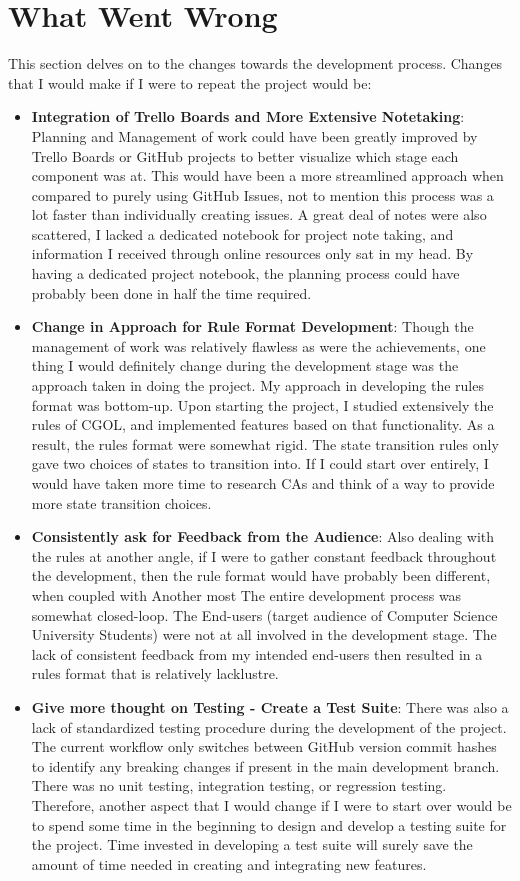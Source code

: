\section{What Went Wrong} \label{whatwentwrong}
This section delves on to the changes towards the development process. Changes that I would make if I were to repeat the project would be:
\begin{itemize}
    \item \textbf{Integration of Trello Boards and More Extensive Notetaking}: Planning and Management of work could have been greatly improved by Trello Boards or GitHub projects to better visualize which stage each component was at. This would have been a more streamlined approach when compared to purely using GitHub Issues, not to mention this process was a lot faster than individually creating issues. A great deal of notes were also scattered, I lacked a dedicated notebook for project note taking, and information I received through online resources only sat in my head. By having a dedicated project notebook, the planning process could have probably been done in half the time required. 
    \item \textbf{Change in Approach for Rule Format Development}: Though the management of work was relatively flawless as were the achievements, one thing I would definitely change during the development stage was the approach taken in doing the project. My approach in developing the rules format was bottom-up. Upon starting the project, I studied extensively the rules of CGOL, and implemented features based on that functionality. As a result, the rules format were somewhat rigid. The state transition rules only gave two choices of states to transition into. If I could start over entirely, I would have taken more time to research CAs and think of a way to provide more state transition choices.
    \item \textbf{Consistently ask for Feedback from the Audience}: Also dealing with the rules at another angle, if I were to gather constant feedback throughout the development, then the rule format would have probably been different, when coupled with Another most The entire development process was somewhat closed-loop. The End-users (target audience of Computer Science University Students) were not at all involved in the development stage. The lack of consistent feedback from my intended end-users then resulted in a rules format that is relatively lacklustre. 
    \item \textbf{Give more thought on Testing - Create a Test Suite}: There was also a lack of standardized testing procedure during the development of the project. The current workflow only switches between GitHub version commit hashes to identify any breaking changes if present in the main development branch. There was no unit testing, integration testing, or regression testing. Therefore, another aspect that I would change if I were to start over would be to spend some time in the beginning to design and develop a testing suite for the project. Time invested in developing a test suite will surely save the amount of time needed in creating and integrating new features. 
\end{itemize}
